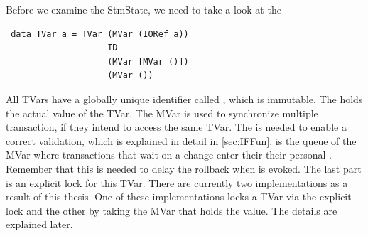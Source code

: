 Before we examine the StmState, we need to take a look at the 
\begin{lstlisting}
 data TVar a = TVar (MVar (IORef a))
                    ID
                    (MVar [MVar ()])
                    (MVar ())
\end{lstlisting}
All TVars have a globally unique identifier called , which is immutable. The  
holds the actual value of the TVar. The MVar is used to synchronize multiple transaction, if they intend to 
access the same TVar. The  is needed to enable a correct validation, which is explained in detail
in \ref{sec:IFFun}.  is the queue of the MVar where transactions that wait on a change
enter their their personal . Remember that this is needed to delay the rollback when 
is evoked. The last part is an explicit lock for this TVar. There are currently two implementations as 
a result of this thesis. One of these implementations locks a TVar via 
the explicit lock and the other by taking the MVar that holds the value. The details are explained later. 

